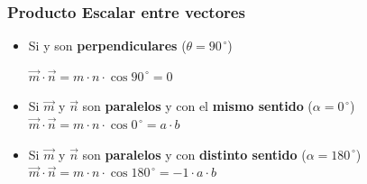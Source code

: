 \documentclass[12pt, twocolumn, landscape, a4paper]{article}
\begin{document}
\subsubsection*{Producto Escalar entre vectores}
\begin{itemize}
\item{Si  y  son \textbf{perpendiculares} ($\theta = 90^{\,\circ}$) \\ 


$\vec{m} \cdot \vec{n} = m \cdot n \cdot \cos 90^{\,\circ} = 0$
}
\item{Si $\overrightarrow{m}$ y $\overrightarrow{n}$ son \textbf{paralelos} y con el \textbf{mismo sentido} ($\alpha = 0^{\,\circ}$) \\ $\vec{m} \cdot \vec{n} = m \cdot n \cdot \cos 0^{\,\circ} = a \cdot b$}
\item{Si $\overrightarrow{m}$ y $\overrightarrow{n}$ son \textbf{paralelos} y con \textbf{distinto sentido} ($\alpha = 180^{\,\circ}$) \\ $\vec{m} \cdot \vec{n} = m \cdot n \cdot \cos 180^{\,\circ} = -1 \cdot a \cdot b $}
\end{itemize}
\end{document}
